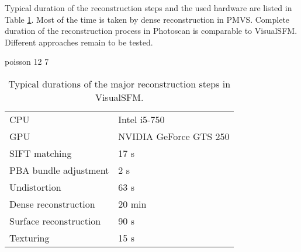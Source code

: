 Typical duration of the reconstruction steps and the used hardware are listed in Table \ref{tab:reconsttime}.
Most of the time is taken by dense reconstruction in PMVS.
Complete duration of the reconstruction process in Photoscan is comparable to VisualSFM.
Different approaches remain to be tested.

poisson 12 7

\begin{table}[h]
	\centering
	\begin{tabular}{l l}
		CPU & Intel i5-750\\
		GPU & NVIDIA GeForce GTS 250\\
		SIFT matching & 17 s\\
		PBA bundle adjustment & 2 s\\
		Undistortion & 63 s\\
		Dense reconstruction & 20 min\\
		Surface reconstruction & 90 s\\
		Texturing & 15 s\\
	\end{tabular}
	\caption{
		Typical durations of the major reconstruction steps in VisualSFM.
	}
	\label{tab:reconsttime}
\end{table}





%
%
%

